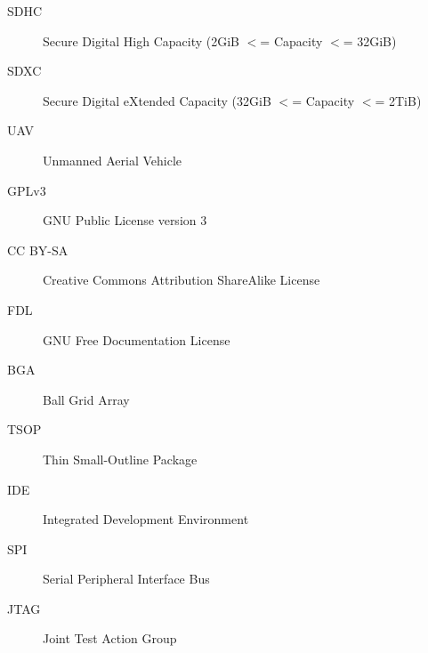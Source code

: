 \begin{description}
	\item[SDHC] Secure Digital High Capacity (2GiB $<$= Capacity $<$= 32GiB)
	\item[SDXC] Secure Digital eXtended Capacity (32GiB $<$= Capacity $<$= 2TiB)
	\item[UAV] Unmanned Aerial Vehicle
	\item[GPLv3] GNU Public License version 3
	\item[CC BY-SA] Creative Commons Attribution ShareAlike License
	\item[FDL] GNU Free Documentation License
	\item[BGA] Ball Grid Array
	\item[TSOP] Thin Small-Outline Package
	\item[IDE] Integrated Development Environment
	\item[SPI] Serial Peripheral Interface Bus
	\item[JTAG] Joint Test Action Group
\end{description}
